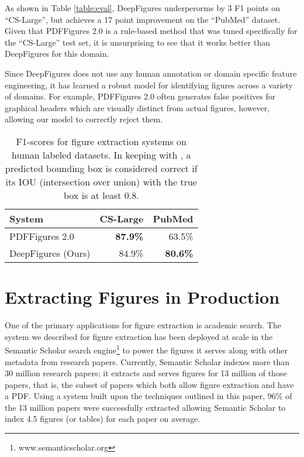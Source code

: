 \documentclass[sigconf]{acmart}
\begin{document}
As shown in Table \ref{table:eval}, DeepFigures underperorms by 3 F1 points on ``CS-Large'', but achieves a 17 point improvement on the ``PubMed'' dataset. 
Given that PDFFigures 2.0 is a rule-based method that was tuned specifically for the ``CS-Large'' test set, it is unsurprising to see that it works better than DeepFigures for this domain. 

Since DeepFigures does not use any human annotation or domain specific feature engineering, it has learned a robust model for identifying figures across a variety of domains.
For example, PDFFigures 2.0 often generates false positives for graphical headers which are visually distinct from actual figures, however, allowing our model to correctly reject them.

\begin{table}
\begin{center}
\begin{tabular}{|l||r|r|} \hline
 System & CS-Large & PubMed\\ \hline 
 PDFFigures 2.0 \cite{pdffigures2} & \bf{87.9\%} & 63.5\%  \\ %
 DeepFigures (Ours) & 84.9\% & \bf{80.6\%} \\ \hline
\end{tabular}
\vspace{0.2cm}
\caption{F1-scores for figure extraction systems on human labeled datasets. In keeping with \cite{pdffigures2}, a predicted bounding box is considered correct if its IOU (intersection over union) with the true box is at least 0.8.}\label{table:eval}
\end{center}
\label{tab:figclsRes}
\end{table}%
\section{Extracting Figures in Production}\label{deployment}%

One of the primary applications for figure extraction is academic search. The system we described for figure extraction has been deployed at scale in the Semantic Scholar search engine\footnote{www.semanticscholar.org} to power the figures it serves along with other metadata from research papers. Currently, Semantic Scholar indexes more than 30 million research papers; it extracts and serves figures for 13 million of those papers, that is, the subset of papers which both allow figure extraction and have a PDF. Using a system built upon the techniques outlined in this paper, 96\% of the 13 million papers were successfully extracted allowing Semantic Scholar to index 4.5 figures (or tables) for each paper on average.
\end{document}
